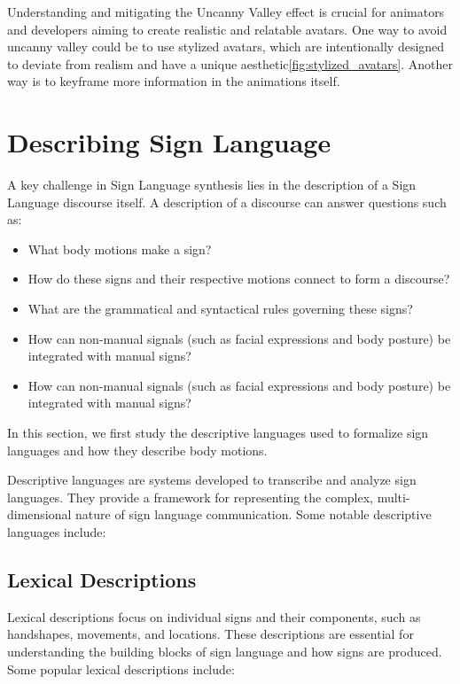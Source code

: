 \documentclass[../../main.tex]{subfiles}
\begin{document}
Understanding and mitigating the Uncanny Valley effect is crucial for animators and developers aiming to create realistic and relatable avatars. One way to avoid uncanny valley could be to use stylized avatars, which are intentionally designed to deviate from realism and have a unique aesthetic\ref{fig:stylized_avatars}. Another way is to keyframe more information in the animations itself.

\section{Describing Sign Language}

A key challenge in Sign Language synthesis lies in the description of a Sign Language discourse itself. A description of a discourse can answer questions such as:

\begin{itemize}
  \item What body motions make a sign?
  \item How do these signs and their respective motions connect to form a discourse?
  \item What are the grammatical and syntactical rules governing these signs?
  \item How can non-manual signals (such as facial expressions and body posture) be integrated with manual signs?
  \item How can non-manual signals (such as facial expressions and body posture) be integrated with manual signs?
\end{itemize}

In this section, we first study the descriptive languages used to formalize sign languages and how they describe body motions.

Descriptive languages are systems developed to transcribe and analyze sign languages. They provide a framework for representing the complex, multi-dimensional nature of sign language communication. Some notable descriptive languages include:

\subsection{Lexical Descriptions}

Lexical descriptions focus on individual signs and their components, such as handshapes, movements, and locations. These descriptions are essential for understanding the building blocks of sign language and how signs are produced. Some popular lexical descriptions include:
\end{document}
